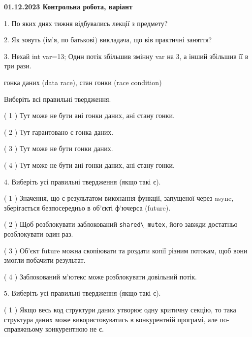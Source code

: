 \documentclass[12pt, ukrainian]{article}
\def\code#1{\Verb!#1!}
\begin{document}
\vspace{4mm}
\newpage
\begin {large}

\textbf{01.12.2023 Контрольна робота, варіант  }\par


{
1. По яких днях тижня відбувались лекції з предмету?



\vspace{5mm}
2. Як зовуть (ім'я, по батькові) викладача, що вів практичні заняття?



\vspace{5mm}
3. Нехай int var=13; Один потік збільшив змінну var на 3, а інший збільшив її в три рази.

гонка даних (data race), стан гонки (race condition)

Виберіть всі правильні твердження.\par
\vspace{2mm}
( 1 ) Тут може не бути ані гонки даних, ані стану гонки.%

( 2 ) Тут гарантовано є гонка даних.%

( 3 ) Тут може не бути гонки даних.%

( 4 ) Тут може не бути ані гонки даних, ані стану гонки.%


\vspace{5mm}
4. Виберіть усі правильні твердження (якщо такі є).\par
\vspace{2mm}

( 1 ) Значення, що є результатом виконання функції, запущеної через async, зберігається безпосередньо в об’єкті ф’ючерса (future).%

( 2 ) Щоб розблокувати заблокований \code{shared\_mutex}, його завжди достатньо розблокувати один раз.%

( 3 ) Об’єкт future можна скопіювати та роздати копії різним потокам, щоб вони змогли побачити результат.%

( 4 ) Заблокований м’ютекс може розблокувати довільний потік.%


\vspace{5mm}
5. Виберіть усі правильні твердження (якщо такі є).\par
\vspace{2mm}

( 1 ) Якщо весь код структури даних утворює одну критичну секцію, то така структура даних може використовуватись в конкурентній програмі, але по-справжньо\-му конкурентною не є.%

}
\end{large}
\end{document}
